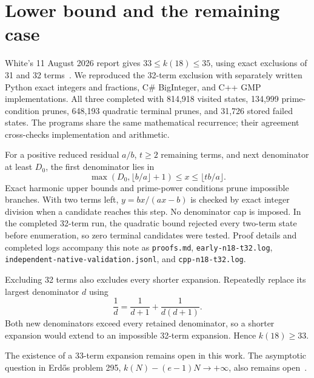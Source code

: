 \documentclass[11pt]{article}
\begin{document}
\section{Lower bound and the remaining case}
White's 11 August 2026 report gives $33\le k(18)\le35$, using exact
exclusions of 31 and 32 terms~\cite{white}. We reproduced the 32-term
exclusion with separately written Python exact integers and fractions,
C\# BigInteger, and C++ GMP implementations. All three completed with
814,918 visited states, 134,999 prime-condition prunes, 648,193 quadratic
terminal prunes, and 31,726 stored failed states. The programs share the
same mathematical recurrence; their agreement cross-checks implementation
and arithmetic.

For a positive reduced residual $a/b$, $t\ge2$ remaining terms, and next
denominator at least $D_0$, the first denominator lies in
\[
\max(D_0,\lfloor b/a\rfloor+1)\le x\le\lfloor tb/a\rfloor.
\]
Exact harmonic upper bounds and prime-power conditions prune impossible
branches. With two terms left, $y=bx/(ax-b)$ is checked by exact integer
division when a candidate reaches this step. No denominator cap is imposed.
In the completed 32-term run, the quadratic bound rejected every two-term
state before enumeration, so zero terminal candidates were tested. Proof details and completed
logs accompany this note as \texttt{proofs.md},
\texttt{early-n18-t32.log}, \texttt{independent-native-validation.jsonl},
and \texttt{cpp-n18-t32.log}.

Excluding 32 terms also excludes every shorter expansion. Repeatedly
replace its largest denominator $d$ using
\[
\frac1d=\frac1{d+1}+\frac1{d(d+1)}.
\]
Both new denominators exceed every retained denominator, so a shorter
expansion would extend to an impossible 32-term expansion. Hence
$k(18)\ge33$.

The existence of a 33-term expansion remains open in this work.
The asymptotic question in Erd\H{o}s problem 295,
$k(N)-(e-1)N\to+\infty$, also remains open~\cite{bloom}.
\end{document}
